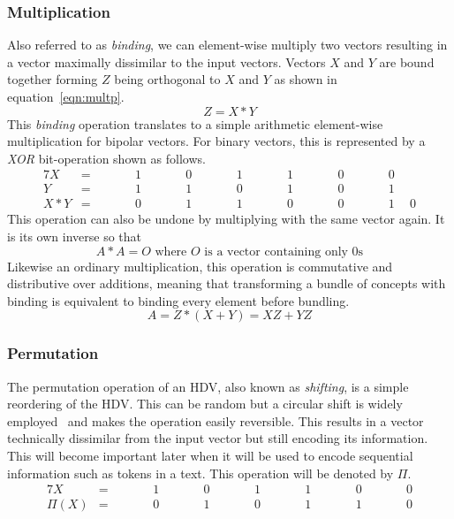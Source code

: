 \subsubsection{Multiplication} \label{sssec:mult}
Also referred to as \textit{binding}, we can element-wise multiply two vectors resulting in a vector maximally dissimilar to the input vectors. Vectors $X$ and $Y$ are bound together forming $Z$ being orthogonal to $X$ and $Y$ as shown in equation~\ref{eqn:multp}.
\begin{equation}
    \label{eqn:multp}
    Z = X * Y
\end{equation}
This \textit{binding} operation translates to a simple arithmetic element-wise multiplication for bipolar vectors. For binary vectors, this is represented by a \textit{XOR} bit-operation shown as follows.
\begin{alignat*}{7}
    X &= && \qquad 1 && \qquad 0 && \qquad 1 && \qquad 1 && \qquad 0 && \qquad 0 \\
    Y &= && \qquad 1 && \qquad 1 && \qquad 0 && \qquad 1 && \qquad 0 && \qquad 1 \\
    \hline
    X * Y &= && \qquad 0 && \qquad 1 && \qquad 1 &&  \qquad 0 && \qquad 0 && \qquad 1 \phantom{-}0
\end{alignat*}
This operation can also be undone by multiplying with the same vector again. It is its own inverse so that
\begin{equation}
    \label{eqn:multpinv}
    A * A = O \text{ where $O$ is a vector containing only 0s}
\end{equation}
Likewise an ordinary multiplication, this operation is commutative and distributive over additions, meaning that transforming a bundle of concepts with binding is equivalent to binding every element before bundling.
\begin{equation}
    \label{eqn:multpdis}
    A = Z*(X + Y) = XZ + YZ
\end{equation}
\subsubsection{Permutation} \label{sssec:perm}
The permutation operation of an HDV, also known as \textit{shifting}, is a simple reordering of the HDV. This can be random but a circular shift is widely employed~\cite{HD_rev} and makes the operation easily reversible. This results in a vector technically dissimilar from the input vector but still encoding its information. This will become important later when it will be used to encode sequential information such as tokens in a text. This operation will be denoted by $\Pi$.
\begin{alignat*}{7}
    X &= && \qquad 1 && \qquad 0 && \qquad 1 && \qquad 1 && \qquad 0 && \qquad 0 \\
    \hline
    \Pi(X) &= && \qquad 0 && \qquad 1 && \qquad 0 &&  \qquad 1 && \qquad 1 && \qquad 0
\end{alignat*}
